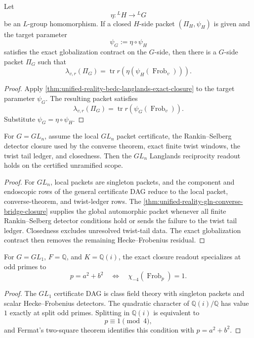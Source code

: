 \begin{corollary}
\label{cor:unified-reality-functorial-exact-closure}
Let
$$
\eta:{}^LH\to{}^LG
$$
be an $L$-group homomorphism. If a closed $H$-side packet
$(\Pi_H,\psi_H)$ is given and the target parameter
$$
\psi_G:=\eta\circ\psi_H
$$
satisfies the exact globalization contract on the $G$-side, then there
is a $G$-side packet $\Pi_G$ such that
$$
\lambda_{v,r}(\Pi_G)
=
\operatorname{tr}r(\eta(\psi_H(\operatorname{Frob}_v))).
$$
\end{corollary}
\begin{proof}
Apply
\autoref{thm:unified-reality-bedc-langlands-exact-closure} to the
target parameter $\psi_G$. The resulting packet satisfies
$$
\lambda_{v,r}(\Pi_G)
=
\operatorname{tr}r(\psi_G(\operatorname{Frob}_v)).
$$
Substitute $\psi_G=\eta\circ\psi_H$.
\end{proof}

\begin{corollary}
\label{cor:unified-reality-gln-exact-closure}
For $G=GL_n$, assume the local $GL_n$ packet certificate, the
Rankin--Selberg detector closure used by the converse theorem, exact
finite twist windows, the twist tail ledger, and closedness. Then the
$GL_n$ Langlands reciprocity readout holds on the certified
unramified scope.
\end{corollary}
\begin{proof}
For $GL_n$, local packets are singleton packets, and the component and
endoscopic rows of the general certificate DAG reduce to the local
packet, converse-theorem, and twist-ledger rows. The
\autoref{thm:unified-reality-gln-converse-bridge-closure} supplies the
global automorphic packet whenever all finite Rankin--Selberg detector
conditions hold or sends the failure to the twist tail ledger.
Closedness excludes unresolved twist-tail data. The exact globalization
contract then removes the remaining Hecke--Frobenius residual.
\end{proof}

\begin{corollary}
\label{cor:unified-reality-exact-globalization-gl1-two-square-shadow}
For $G=GL_1$, $F=\mathbb Q$, and $K=\mathbb Q(i)$, the exact closure
readout specializes at odd primes to
$$
p=a^2+b^2
\quad\Longleftrightarrow\quad
\chi_{-4}(\operatorname{Frob}_p)=1.
$$
\end{corollary}
\begin{proof}
The $GL_1$ certificate DAG is class field theory with singleton
packets and scalar Hecke--Frobenius detectors. The quadratic character
of $\mathbb Q(i)/\mathbb Q$ has value $1$ exactly at split odd primes.
Splitting in $\mathbb Q(i)$ is equivalent to
$$
p\equiv 1\pmod 4,
$$
and Fermat's two-square theorem identifies this condition with
$p=a^2+b^2$.
\end{proof}

